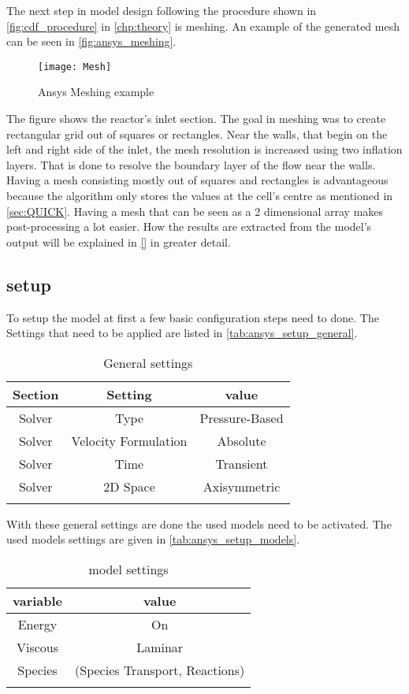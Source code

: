 \documentclass[../thesis.tex]{subfiles}
\begin{document}
The next step in model design following the procedure shown in \autoref{fig:cdf_procedure} in \autoref{chp:theory} is meshing. An example of the generated mesh can be seen in \autoref{fig:ansys_meshing}.
\begin{figure}[htb]
	\centering
	\texttt{[image: Mesh]}
	\caption{Ansys Meshing example}
	\label{fig:ansys_meshing}
\end{figure}
The figure shows the reactor's inlet section. The goal in meshing was to create rectangular grid out of squares or rectangles. Near the walls, that begin on the left and right side of the inlet, the mesh resolution is increased using two inflation layers. That is done to resolve the boundary layer of the flow near the walls. Having a mesh consisting mostly out of squares and rectangles is advantageous because the algorithm only stores the values at the cell's centre as mentioned in \autoref{sec:QUICK}. Having a mesh that can be seen as a 2 dimensional array makes post-processing a lot easier. How the results are extracted from the model's output will be explained in \autoref{} in greater detail.

\subsection{setup}
\label{sec: setup}

To setup the model at first a few basic configuration steps need to done. The Settings that need to be applied are listed in \autoref{tab:ansys_setup_general}.

\begin{table} [htb]
	\centering
	\caption{General settings}
	\begin{tabular}{ ccc }
		\hline
		Section & Setting & value \\
		\hline
		Solver & Type & Pressure-Based \\
		Solver & Velocity Formulation & Absolute  \\
		Solver & Time &  Transient  \\
		Solver & 2D Space & Axisymmetric \\
		\hline
		\label{tab:ansys_setup_general}
	\end{tabular}
\end{table}
With these general settings are done the used models need to be activated. The used models settings are given in \autoref{tab:ansys_setup_models}.

\begin{table} [htb]
	\centering
	\caption{model settings}
	\begin{tabular}{ cc }
		\hline
		variable & value \\
		\hline
		Energy & On \\
		Viscous & Laminar \\
		Species & (Species Transport, Reactions)  \\
		\hline
		\label{tab:ansys_setup_models}
	\end{tabular}
\end{table}
\end{document}
